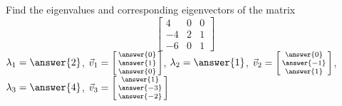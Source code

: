\documentclass{ximera}
\begin{document}
\begin{exercise}%
    Find the eigenvalues and corresponding eigenvectors of the matrix 
    \[ 
        \begin{bmatrix} 
        4 & 0 & 0 \\ 
        -4 & 2 & 1 \\ 
        -6 & 0 & 1 
        \end{bmatrix} 
    \]
    $\lambda_1 = \answer{2}$, $\vec{v}_1 = \left[\begin{smallmatrix} \answer{0}\\ \answer{1}\\ \answer{0} \end{smallmatrix}\right]$, $\lambda_2 = \answer{1}$, $\vec{v}_2 = \left[\begin{smallmatrix} \answer{0}\\ \answer{-1}\\ \answer{1} \end{smallmatrix}\right]$, $\lambda_3 = \answer{4}$, $\vec{v}_3 = \left[\begin{smallmatrix} \answer{1}\\ \answer{-3}\\ \answer{-2} \end{smallmatrix}\right]$
\end{exercise}
\end{document}
